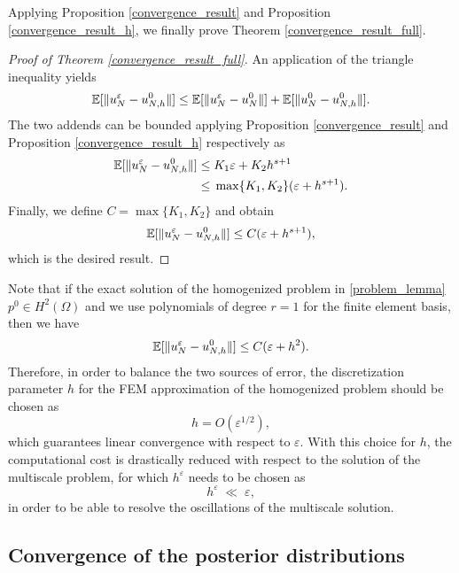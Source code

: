 Applying Proposition \ref{convergence_result} and Proposition \ref{convergence_result_h}, we finally prove Theorem \ref{convergence_result_full}.
\begin{proof}[Proof of Theorem \ref{convergence_result_full}]
An application of the triangle inequality yields
\[ \mathbb{E}[ \lVert u_N^{\varepsilon} - u_{N,h}^0\rVert ] \le \mathbb{E} [ \lVert u_N^{\varepsilon} - u_N^0\rVert ] + \mathbb{E} [ \lVert u_N^0 - u_{N,h}^0\rVert ]. \]
The two addends can be bounded applying Proposition \ref{convergence_result} and Proposition \ref{convergence_result_h} respectively as
\begin{align*}
\mathbb{E}[ \lVert u_N^{\varepsilon} - u_{N,h}^0\rVert ] \le & \; K_1 \varepsilon + K_2 h^{s+1} \\
\le & \; \max \{ K_1, K_2 \} (\varepsilon + h^{s+1}).
\end{align*}
Finally, we define $C = \max \{ K_1, K_2 \}$ and obtain
\begin{equation*}
\mathbb{E}[ \lVert u_N^{\varepsilon} - u_{N,h}^0\rVert ] \le C (\varepsilon + h^{s+1}),
\end{equation*}
which is the desired result.
\end{proof}

\begin{remark}
Note that if the exact solution of the homogenized problem in \eqref{problem_lemma} $p^0 \in H^{2}(\Omega)$ and we use polynomials of degree $r = 1$ for the finite element basis, then we have
\begin{equation*}
\mathbb{E}[ \lVert u_N^{\varepsilon} - u_{N,h}^0\rVert ] \le C (\varepsilon + h^2).
\end{equation*}
Therefore, in order to balance the two sources of error, the discretization parameter $h$ for the FEM approximation of the homogenized problem should be chosen as
\begin{equation}
\label{heremark}
h = O( \varepsilon^{1/2} ),
\end{equation}
which guarantees linear convergence with respect to $\varepsilon$. With this choice for $h$, the computational cost is drastically reduced with respect to the solution of the multiscale problem, for which $h^{\varepsilon}$ needs to be chosen as
\[ h^{\varepsilon} \; \ll \; \varepsilon, \]
in order to be able to resolve the oscillations of the multiscale solution.
\end{remark}

\subsection{Convergence of the posterior distributions}

